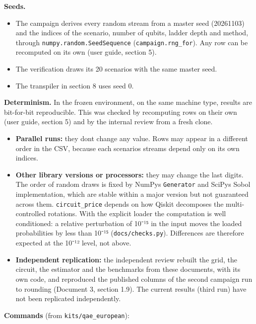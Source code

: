 \documentclass[
  10pt,
]{article}
\providecommand{\tightlist}{%
  \setlength{\itemsep}{0pt}\setlength{\parskip}{0pt}}
\begin{document}
\textbf{Seeds.}

\begin{itemize}
\tightlist
\item
  The campaign derives every random stream from a master seed (20261103)
  and the indices of the scenario, number of qubits, ladder depth and
  method, through \texttt{numpy.random.SeedSequence}
  (\texttt{campaign.rng\_for}). Any row can be recomputed on its own
  (user guide, section 5).
\item
  The verification draws its 20 scenarios with the same master seed.
\item
  The transpiler in section 8 uses seed 0.
\end{itemize}

\textbf{Determinism.} In the frozen environment, on the same machine
type, results are bit-for-bit reproducible. This was checked by
recomputing rows on their own (user guide, section 5) and by the
internal review from a fresh clone.

\begin{itemize}
\tightlist
\item
  \textbf{Parallel runs:} they don\textquotesingle t change any value.
  Rows may appear in a different order in the CSV, because each
  scenario\textquotesingle s streams depend only on its own indices.
\item
  \textbf{Other library versions or processors:} they may change the
  last digits. The order of random draws is fixed by
  NumPy\textquotesingle s \texttt{Generator} and SciPy\textquotesingle s
  Sobol implementation, which are stable within a major version but not
  guaranteed across them. \texttt{circuit\_price} depends on how Qiskit
  decomposes the multi-controlled rotations. With the explicit loader
  the computation is well conditioned: a relative perturbation of 10⁻¹⁵
  in the input moves the loaded probabilities by less than 10⁻¹⁵
  (\texttt{docs/checks.py}). Differences are therefore expected at the
  10⁻¹² level, not above.
\item
  \textbf{Independent replication:} the independent review rebuilt the
  grid, the circuit, the estimator and the benchmarks from these
  documents, with its own code, and reproduced the published columns of
  the second campaign run to rounding (Document 3, section 1.9). The
  current results (third run) have not been replicated independently.
\end{itemize}

\textbf{Commands} (from \texttt{kits/qae\_european}):
\end{document}
